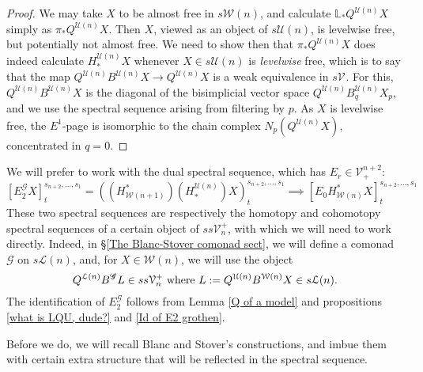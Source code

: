 \documentclass[11pt]{amsart} \renewcommand{\baselinestretch}{1.4}
\theoremstyle{plain}
\theoremstyle{definition}
\renewcommand{\to}{\longrightarrow}
\newcommand{\scrG}{\mathscr{G}}
\newcommand{\calU}{\mathcal{U}}
\newcommand{\calL}{\mathcal{L}}
\newcommand{\calV}{\mathcal{V}}
\newcommand{\calw}{\mathcal{W}}
\newcommand{\vect}[2]{\calV^{#1}_{#2}}
\newcommand{\BSW}{{\scrG}}
\newcommand{\BSWres}{B^\BSW}%
\newcommand{\E}[5]{[E^{#1}_{#2}#3]^{#4}_{#5}}
\newcommand{\Edown}[4]{[E_{#1}#2]^{#3}_{#4}}
\begin{document}
\begin{Composite functor spectral sequences}
\begin{proof}
We may take $X$ to be almost free in $s\calw(n)$, and calculate $\mathbb{L}_*Q^{\calU(n)}X$ simply as $\pi_*Q^{\calU(n)}X$. Then $X$, viewed as an object of $s\calU(n)$, is levelwise free, but potentially not almost free. We need to show then that $\pi_*Q^{\calU(n)}X$ does indeed calculate $H_*^{\calU(n)}X$ whenever $X\in s\calU(n)$ is \emph{levelwise} free, which is to say that the map $Q^{\calU(n)}B^{\calU(n)}X\to Q^{\calU(n)}X$ is a weak equivalence in $s\vect{}{}$. For this, $Q^{\calU(n)}B^{\calU(n)}X$ is the diagonal of the bisimplicial vector space $Q^{\calU(n)}B_q^{\calU(n)}X_p$, and we use the spectral sequence arising from filtering by $p$. As $X$ is levelwise free, the $E^1$-page is isomorphic to the chain complex $N_p(Q^{\calU(n)}X)$, concentrated in $q=0$.
\end{proof}
We will prefer to work with the dual spectral sequence, which has $E_r\in\vect{n+2}{+}$:
\[\E{\BSW}{2}{X}{s_{n+2},\ldots,s_1}{t}=((H^*_{\calw(n+1)})(H_*^{\calU(n)})X)^{s_{n+2},\ldots,s_1}_t\implies \Edown{0}{H^*_{\calw(n)}X}{s_{n+2},\ldots,s_1}{t}\]
These two spectral sequences are respectively the homotopy and cohomotopy spectral sequences of a certain object of $ss\vect{+}{n}$, with which we will need to work directly. Indeed, in \S\ref{The Blanc-Stover comonad sect}, we will define a comonad $\BSW$ on $s\calL(n)$, and, for  $X\in\calw(n)$,
we will use the object
\[Q^{\calL(n)}\BSWres L\in ss\vect{+}{n}\textup{ where } L:=Q^{\calU(n)}{ B^{\calw(n)}X}\in s\calL(n).\]
The identification of $E_2^\BSW$ follows from Lemma \ref{Q of a model} and propositions \ref{what is LQU, dude?} and \ref{Id of E2 grothen}.



Before we do, we will recall Blanc and Stover's constructions, and imbue them with certain extra structure that will be reflected in the spectral sequence.


\end{Composite functor spectral sequences}
\end{document}
